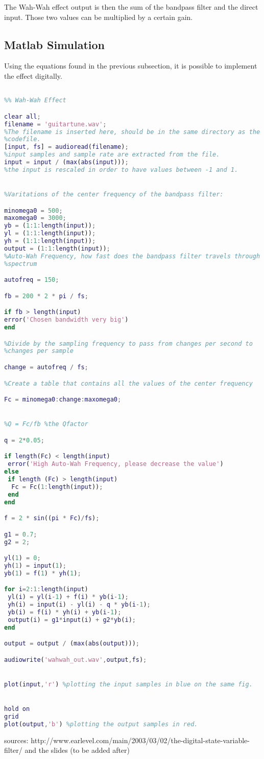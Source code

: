 The Wah-Wah effect output is then the sum of the bandpass filter and the direct input. Those two values can be multiplied by a certain gain. \\

\subsection{Matlab Simulation}

Using the equations found in the previous subsection, it is possible to implement the effect digitally. 

\begin{lstlisting}[language=Matlab, caption= Matlab code for wah-wah effect]

%% Wah-Wah Effect 

clear all;
filename = 'guitartune.wav'; 
%The filename is inserted here, should be in the same directory as the
%codefile.
[input, fs] = audioread(filename);
%input samples and sample rate are extracted from the file.
input = input / (max(abs(input)));
%the input is rescaled in order to have values between -1 and 1.


%Varitations of the center frequency of the bandpass filter:

minomega0 = 500;
maxomega0 = 3000;
yb = (1:1:length(input));
yl = (1:1:length(input));
yh = (1:1:length(input));
output = (1:1:length(input));
%Auto-Wah Frequency, how fast does the bandpass filter travels through the
%spectrum

autofreq = 150;

fb = 200 * 2 * pi / fs;

if fb > length(input)
error('Chosen bandwidth very big')
end

%Divide by the sampling frequency to pass from changes per second to
%changes per sample

change = autofreq / fs;

%Create a table that contains all the values of the center frequency

Fc = minomega0:change:maxomega0;


%Q = Fc/fb %the Qfactor

q = 2*0.05;

if length(Fc) < length(input)
 error('High Auto-Wah Frequency, please decrease the value')
else 
 if length (Fc) > length(input)
  Fc = Fc(1:length(input));
 end
end

f = 2 * sin((pi * Fc)/fs);

g1 = 0.7;
g2 = 2;

yl(1) = 0;
yh(1) = input(1);
yb(1) = f(1) * yh(1);

for i=2:1:length(input)
 yl(i) = yl(i-1) + f(i) * yb(i-1);
 yh(i) = input(i) - yl(i) - q * yb(i-1);
 yb(i) = f(i) * yh(i) + yb(i-1);
 output(i) = g1*input(i) + g2*yb(i);
end

output = output / (max(abs(output)));

audiowrite('wahwah_out.wav',output,fs);


plot(input,'r') %plotting the input samples in blue on the same fig.


hold on
grid
plot(output,'b') %plotting the output samples in red.

\end{lstlisting}

sources:
http://www.earlevel.com/main/2003/03/02/the-digital-state-variable-filter/ and the slides (to be added after)
